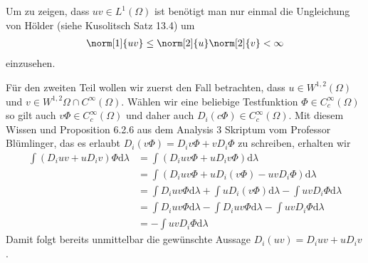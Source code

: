 \begin{solution}
    Um zu zeigen, dass $uv\in L^1(\Omega)$ ist benötigt man nur einmal die Ungleichung von Hölder (siehe Kusolitsch Satz 13.4) um
\begin{align*}
    \norm[1]{uv}\leq\norm[2]{u}\norm[2]{v}<\infty
\end{align*}
einzusehen.

Für den zweiten Teil wollen wir zuerst den Fall betrachten, dass $u\in W^{1,2}(\Omega)$ und $v\in W^{1,2}\Omega\cap C^\infty(\Omega)$. Wählen wir eine beliebige Testfunktion $\Phi\in C_c^\infty(\Omega)$ so gilt auch $v\Phi\in C_c^\infty(\Omega)$ und daher auch $D_i(c\Phi)\in C_c^\infty(\Omega)$. Mit diesem Wissen und Proposition 6.2.6 aus dem Analysis 3 Skriptum vom Professor Blümlinger, das es erlaubt $D_i(v\Phi)=D_iv\Phi+vD_i\Phi$ zu schreiben, erhalten wir
\begin{align*}
    \int(D_iuv+uD_iv)\Phi\mathrm{d}\lambda&=\int(D_iuv\Phi+uD_iv\Phi)\mathrm{d}\lambda\\
    &=\int(D_iuv\Phi+uD_i(v\Phi)-uvD_i\Phi)\mathrm{d}\lambda\\
    &=\int D_iuv\Phi\mathrm{d}\lambda+\int uD_i(v\Phi)\mathrm{d}\lambda-\int uvD_i\Phi\mathrm{d}\lambda\\
    &=\int D_iuv\Phi\mathrm{d}\lambda-\int D_iuv\Phi\mathrm{d}\lambda-\int uvD_i\Phi \mathrm{d}\lambda\\
    &=-\int uvD_i\Phi \mathrm{d}\lambda
\end{align*}
Damit folgt bereits unmittelbar die gewünschte Aussage $D_i(uv)=D_iuv+uD_iv$.


\end{solution}
